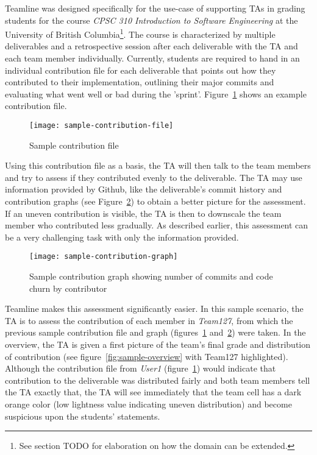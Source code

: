 \documentclass[../manifest.tex]{subfiles}
\begin{document}
Teamline was designed specifically for the use-case of supporting TAs in grading students for the course \textit{CPSC 310 Introduction to Software Engineering} at the University of British Columbia\footnote{See section TODO for elaboration on how the domain can be extended.}. The course is characterized by multiple deliverables and a retrospective session after each deliverable with the TA and each team member individually. Currently, students are required to hand in an individual contribution file for each deliverable that points out how they contributed to their implementation, outlining their major commits and evaluating what went well or bad during the 'sprint'. Figure~\ref{fig:sample-contribution-file} shows an example contribution file.

\begin{figure}[h]
  \centering
  \texttt{[image: sample-contribution-file]}
  \caption{Sample contribution file}
  \label{fig:sample-contribution-file}
\end{figure}

Using this contribution file as a basis, the TA will then talk to the team members and try to assess if they contributed evenly to the deliverable. The TA may use information provided by Github, like the deliverable's commit history and contribution graphs (see Figure~\ref{fig:sample-contribution-graph}) to obtain a better picture for the assessment. If an uneven contribution is visible, the TA is then to downscale the team member who contributed less gradually. As described earlier, this assessment can be a very challenging task with only the information provided.

\begin{figure}[h]
  \centering
  \texttt{[image: sample-contribution-graph]}
  \caption{Sample contribution graph showing number of commits and code churn by contributor}
  \label{fig:sample-contribution-graph}
\end{figure}

Teamline makes this assessment significantly easier. In this sample scenario, the TA is to assess the contribution of each member in \textit{Team127}, from which the previous sample contribution file and graph (figures~\ref{fig:sample-contribution-file} and~\ref{fig:sample-contribution-graph}) were taken. In the overview, the TA is given a first picture of the team's final grade and distribution of contribution (see figure~\ref{fig:sample-overview} with Team127 highlighted). Although the contribution file from \textit{User1} (figure~\ref{fig:sample-contribution-file}) would indicate that contribution to the deliverable was distributed fairly and both team members tell the TA exactly that, the TA will see immediately that the team cell has a dark orange color (low lightness value indicating uneven distribution) and become suspicious upon the students' statements.
\end{document}
